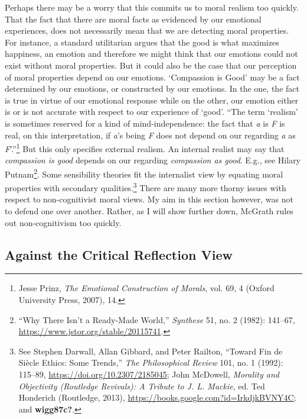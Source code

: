 \documentclass[
  12pt,
]{book}
\theoremstyle{definition}
\theoremstyle{definition}
\theoremstyle{definition}
\theoremstyle{definition}
\theoremstyle{remark}
\begin{document}
Perhaps there may be a worry that this commits us to moral realism too quickly. That the fact that there are moral facts as evidenced by our emotional experiences, does not necessarily mean that we are detecting moral properties. For instance, a standard utilitarian argues that the good is what maximizes happiness, an emotion and therefore we might think that our emotions could not exist without moral properties. But it could also be the case that our perception of moral properties depend on our emotions. `Compassion is Good' may be a fact determined by our emotions, or constructed by our emotions. In the one, the fact is true in virtue of our emotional response while on the other, our emotion either is or is not accurate with respect to our experience of `good'. ``The term `realism' is sometimes reserved for a kind of mind-independence: the fact that \emph{a} is \emph{F} is real, on this interpretation, if \emph{a}'s being \emph{F} does not depend on our regarding \emph{a} as \emph{F}'.''\footnote{Jesse Prinz, \emph{The {Emotional Construction} of {Morals}}, vol. 69, 4 (Oxford University Press, 2007), 14.} But this only specifies external realism. An internal realist may say that \emph{compassion is good} depends on our regarding \emph{compassion as good}. E.g., see Hilary Putnam\footnote{{``Why {There Isn}'t a {Ready-Made World},''} \emph{Synthese} 51, no. 2 (1982): 141--67, \url{https://www.jstor.org/stable/20115741}.}. Some sensibility theories fit the internalist view by equating moral properties with secondary qualities.\footnote{See Stephen Darwall, Allan Gibbard, and Peter Railton, {``Toward Fin de Siècle Ethics: Some Trends,''} \emph{The Philosophical Review} 101, no. 1 (1992): 115--89, \url{https://doi.org/10.2307/2185045}; John McDowell, \emph{Morality and {Objectivity} ({Routledge Revivals}): {A Tribute} to {J}. {L}. {Mackie}}, ed. Ted Honderich (Routledge, 2013), \url{https://books.google.com?id=IrkdjkBVNY4C}; and \textbf{wigg87c?}.} There are many more thorny issues with respect to non-cognitivist moral views. My aim in this section however, was not to defend one over another. Rather, as I will show further down, McGrath rules out non-cognitivism too quickly.

\subsection*{Against the Critical Reflection View}\label{against-the-critical-reflection-view}
\end{document}
